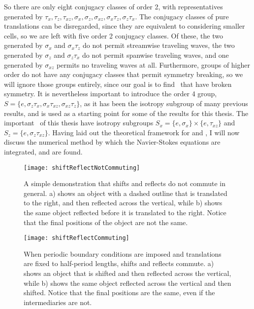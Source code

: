 So there are only eight conjugacy classes of order 2, with representatives generated by $\tau_x,\tau_z,\tau_{xz}, \sigma_x,\sigma_z,\sigma_{xz},\sigma_{x}\tau_z,\sigma_z\tau_x$. The conjugacy classes of pure translations can be disregarded, since they are equivalent to considering smaller cells, so we are left with five order 2 conjugacy classes. Of these, the two  generated by $\sigma_x$ and $\sigma_x\tau_z$ do not permit streamwise traveling waves, the two generated by $\sigma_z$ and $\sigma_z\tau_x$ do not permit spanwise traveling waves, and one generated by  $\sigma_{xz}$ permits no traveling waves at all. Furthermore, groups of higher order do not have any conjugacy classes that permit symmetry breaking, so we will ignore those groups entirely, since our goal is to find \ecs\ that have broken symmetry. It is nevertheless important to introduce the order 4 group, $S = \{ e, \sigma_z\tau_x,\sigma_x\tau_{xz},\sigma_{xz}\tau_z\}$, as it has been the isotropy subgroup of many previous results, and is used as a starting point for some of the results for this thesis. The important \ecs\ of this thesis have isotropy subgroups $S_x = \{ e, \sigma_x\} \times \{e,\tau_{xz}\}$ and $S_z = \{e, \sigma_z\tau_{xz}\}$. Having laid out the theoretical framework for \pCf and \ecs, I will now discuss the numerical method by which the Navier-Stokes equations are integrated, and \ecs are found.  
\begin{figure}[t!]
\texttt{[image: shiftReflectNotCommuting]}
\caption{A simple demonstration that shifts and reflects do not commute in general. a) shows an object with a dashed outline that is translated to the right, and then reflected across the vertical, while b) shows the same object reflected before it is translated to the right. Notice that the final positions of the object are not the same.}\label{fig:notabelian}
\end{figure}

\begin{figure}[t!]
\texttt{[image: shiftReflectCommuting]}
\caption{When periodic boundary conditions are imposed and translations are fixed to half-period lengths, shifts and reflects commute. a) shows an object that is shifted and then reflected across the vertical, while b) shows the same object reflected across the vertical and then shifted. Notice that the final positions are the same, even if the intermediaries are not.}\label{fig:abelian}
\end{figure}
  
